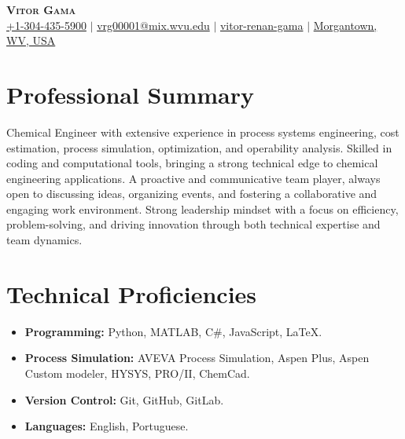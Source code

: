 \documentclass[letterpaper,11pt]{article}
\newcommand{\resumeItem}[1]{
  \item\small{
    {#1 \vspace{-2pt}}
  }
}
\newcommand{\resumeItemListStart}{\begin{itemize}}
\newcommand{\resumeItemListEnd}{\end{itemize}\vspace{-5pt}}
\begin{document}

\begin{center}
  \textbf{\Huge \scshape Vitor Gama} \\ \vspace{3pt}
  \small
  \faMobile \hspace{.5pt} \href{tel:13044355900}{\color{blue}+1-304-435-5900}
  $|$
  \faAt \hspace{.5pt} \href{mailto:vrg00001@mix.wvu.edu}{\color{blue}vrg00001@mix.wvu.edu}
  $|$
  \faLinkedinSquare \hspace{.5pt} \href{https://www.linkedin.com/in/vitor-renan-gama/}{\color{blue}vitor-renan-gama}
  $|$
  \faMapMarker \hspace{.5pt} \href{https://www.google.com/maps/place/Engineering+Sciences+Building,+Morgantown,+WV+26505/@39.6459272,-79.9759171,17z/data=!3m1!4b1!4m6!3m5!1s0x88357b99ed193599:0x9b885a8237a27b09!8m2!3d39.6459231!4d-79.9733422!16s%2Fg%2F1q64f48kq?entry=ttu}{\color{blue}Morgantown, WV, USA}
\end{center}


\section*{Professional Summary}
Chemical Engineer with extensive experience in process systems engineering, cost estimation, process simulation, optimization, and operability analysis. Skilled in coding and computational tools, bringing a strong technical edge to chemical engineering applications. A proactive and communicative team player, always open to discussing ideas, organizing events, and fostering a collaborative and engaging work environment. 
Strong leadership mindset with a focus on efficiency, problem-solving, and driving innovation through both technical expertise and team dynamics.

\section*{Technical Proficiencies}
\resumeItemListStart
    \resumeItem{\textbf{Programming:} Python, MATLAB, C\#, JavaScript, LaTeX.}
    \resumeItem{\textbf{Process Simulation:} AVEVA Process Simulation, Aspen Plus, Aspen Custom modeler, HYSYS, PRO/II, ChemCad.}
    \resumeItem{\textbf{Version Control:} Git, GitHub, GitLab.}
    \resumeItem{\textbf{Languages:} English, Portuguese.}
\resumeItemListEnd
\end{document}
